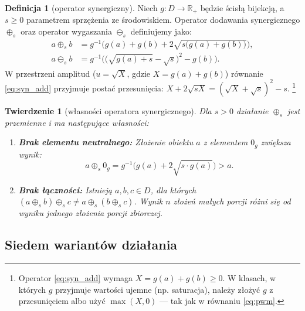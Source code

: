 \documentclass[11pt,a4paper]{article}
\theoremstyle{definition}
\newtheorem{definition}{Definicja}[section]
\theoremstyle{plain}
\newtheorem{theorem}{Twierdzenie}[section]
\begin{document}
\begin{definition}[operator synergiczny]
Niech $g: D \to \mathbb{R}_+$ będzie ścisłą bijekcją, a $s \ge 0$ parametrem sprzężenia ze środowiskiem. Operator dodawania synergicznego $\oplus_s$ oraz operator wygaszania $\ominus_s$ definiujemy jako:
\begin{align}
    a \oplus_s b &= g^{-1}\Big( g(a) + g(b) + 2\sqrt{s\big(g(a) + g(b)\big)} \Big), \label{eq:syn_add} \\
    a \ominus_s b &= g^{-1}\Big( \big(\sqrt{g(a) + s} - \sqrt{s}\big)^2 - g(b) \Big). \label{eq:syn_sub}
\end{align}
W przestrzeni amplitud ($u = \sqrt{X}$, gdzie $X = g(a) + g(b)$) równanie \eqref{eq:syn_add} przyjmuje postać przesunięcia: $X + 2\sqrt{sX} = (\sqrt{X} + \sqrt{s})^2 - s$.
\footnote{Operator \eqref{eq:syn_add} wymaga $X = g(a)+g(b) \ge 0$. W klasach, w których $g$ przyjmuje wartości ujemne (np. saturacja), należy złożyć $g$ z przesunięciem albo użyć $\max(X,0)$ --- tak jak w równaniu \eqref{eq:pwm}.}
\end{definition}

\begin{theorem}[własności operatora synergicznego]
Dla $s > 0$ działanie $\oplus_s$ jest przemienne i ma następujące własności:
\begin{enumerate}
    \item \textbf{Brak elementu neutralnego:} Złożenie obiektu $a$ z elementem $0_g$ zwiększa wynik:
    \begin{equation}
        a \oplus_s 0_g = g^{-1}\Big(g(a) + 2\sqrt{s \cdot g(a)}\Big) > a.
    \end{equation}
    \item \textbf{Brak łączności:} Istnieją $a, b, c \in D$, dla których $(a \oplus_s b) \oplus_s c \neq a \oplus_s (b \oplus_s c)$. Wynik $n$ złożeń małych porcji różni się od wyniku jednego złożenia porcji zbiorczej.
\end{enumerate}
\end{theorem}

\subsection{Siedem wariantów działania}
\end{document}
